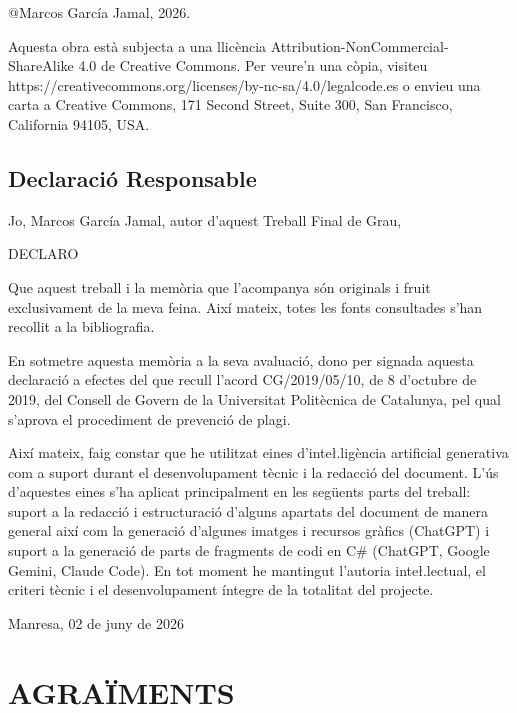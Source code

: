 \documentclass[a4paper,11pt,DIV=13,headings=normal,abstract=true,twoside=semi]{article}
\begin{document}
\newpage
\noindent @Marcos García Jamal, 2026.
\bigskip

\noindent Aquesta obra està subjecta a una llicència Attribution-NonCommercial-ShareAlike 4.0 de Creative Commons. Per veure'n una còpia, visiteu https://creativecommons.org/licenses/by-nc-sa/4.0/legalcode.es o envieu una carta a Creative Commons, 171
Second Street, Suite 300, San Francisco, California 94105, USA.
\thispagestyle{empty}

\newpage
\null
\thispagestyle{empty}
\newpage

\begin{center}

    \section*{Declaració Responsable}
\end{center}

    \noindent Jo, Marcos García Jamal, autor d'aquest Treball Final de Grau,

    \noindent DECLARO

    \noindent Que aquest treball i la memòria que l'acompanya són originals i fruit exclusivament de la meva feina. Així mateix, totes les fonts consultades s'han recollit a la bibliografia.

    \noindent En sotmetre aquesta memòria a la seva avaluació, dono per signada aquesta declaració a efectes del que recull l'acord CG/2019/05/10, de 8 d'octubre de 2019, del Consell de Govern de la Universitat Politècnica de Catalunya, pel qual s'aprova el procediment de prevenció de plagi.
    
    \noindent Així mateix, faig constar que he utilitzat eines d'inte\l.ligència artificial generativa com a suport durant el desenvolupament tècnic i la redacció del document. L'ús d'aquestes eines s'ha aplicat principalment en les següents parts del treball: suport a la redacció i estructuració d'alguns apartats del document de manera general així com la generació d'algunes imatges i recursos gràfics (ChatGPT) i suport a la generació de parts de fragments de codi en C\# (ChatGPT, Google Gemini, Claude Code). En tot moment he mantingut l'autoria inte\l.lectual, el criteri tècnic i el desenvolupament íntegre de la totalitat del projecte.

    \noindent Manresa, 02 de juny de 2026
\thispagestyle{empty}

\newpage
\section*{AGRAÏMENTS}
\end{document}
